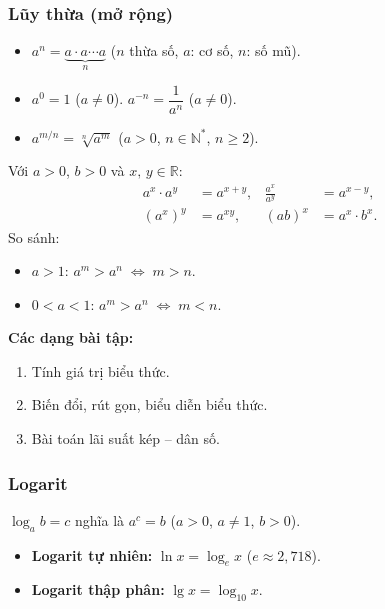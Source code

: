 \documentclass[12pt,a4paper]{article}
\begin{document}
\subsubsection{Lũy thừa (mở rộng)}

\begin{dinhnghia}
  \begin{itemize}
    \item $a^n = \underbrace{a \cdot a \cdots a}_{n}$ \;($n$ thừa số, $a$: cơ số, $n$: số mũ).
    \item $a^0 = 1$ \;($a \ne 0$). \quad $a^{-n} = \dfrac{1}{a^n}$ \;($a \ne 0$).
    \item $a^{m/n} = \sqrt[n]{a^m}$ \;($a > 0$, $n \in \mathbb{N}^*$, $n \ge 2$).
  \end{itemize}
\end{dinhnghia}

\begin{congthuc}[title={Tính chất lũy thừa}]
  Với $a > 0$, $b > 0$ và $x,\, y \in \mathbb{R}$:
  \begin{align}
    a^x \cdot a^y &= a^{x+y}, &
    \frac{a^x}{a^y} &= a^{x-y}, \\
    (a^x)^y &= a^{xy}, &
    (ab)^x &= a^x \cdot b^x.
  \end{align}
  So sánh:
  \begin{itemize}
    \item $a > 1$: \;$a^m > a^n \;\Leftrightarrow\; m > n$.
    \item $0 < a < 1$: \;$a^m > a^n \;\Leftrightarrow\; m < n$.
  \end{itemize}
\end{congthuc}

\medskip\noindent\textbf{Các dạng bài tập:}
\begin{enumerate}[label=\textbf{Dạng \arabic*:}, leftmargin=*, align=left]
  \item Tính giá trị biểu thức.
  \item Biến đổi, rút gọn, biểu diễn biểu thức.
  \item Bài toán lãi suất kép -- dân số.
\end{enumerate}

\subsubsection{Logarit}

\begin{dinhnghia}
  $\log_a b = c$ nghĩa là $a^c = b$ \;($a > 0$, $a \ne 1$, $b > 0$).
  \begin{itemize}
    \item \textbf{Logarit tự nhiên:} $\ln x = \log_e x$ \;($e \approx 2{,}718$).
    \item \textbf{Logarit thập phân:} $\lg x = \log_{10} x$.
  \end{itemize}
\end{dinhnghia}
\end{document}

